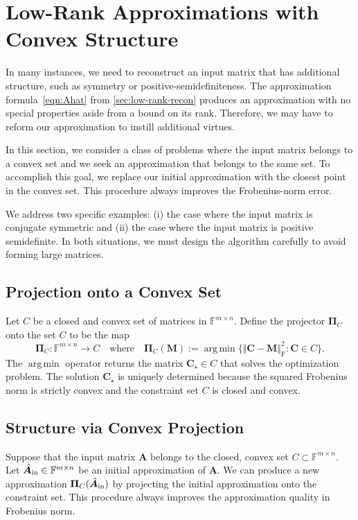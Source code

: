 \documentclass[final]{siamart1116}
\numberwithin{equation}{section}
\numberwithin{theorem}{section}
\numberwithin{figure}{section}
\newcommand{\F}{\mathbb{F}}
\newcommand{\mtx}[1]{\bm{#1}}
\newcommand{\norm}[1]{\Vert #1 \Vert}
\newcommand{\fnorm}[1]{\norm{#1}_{\mathrm{F}}}
\newcommand{\fnormsq}[1]{\fnorm{#1}^2}
\newcommand{\argmin}{\operatorname{arg\,min}}
\begin{document}
\section{Low-Rank Approximations with Convex Structure}
\label{sec:structured}

In many instances, we need to reconstruct an input matrix
that has additional structure, such as symmetry or positive-semidefiniteness.
The approximation formula~\cref{eqn:Ahat}
from \cref{sec:low-rank-recon}
produces an approximation with
no special properties aside from a bound on its rank.
Therefore, we may have to reform our approximation to instill additional virtues.

In this section, we consider a class of problems where
the input matrix belongs to a convex set and we seek an
approximation that belongs to the same set.  To accomplish this
goal, we replace our initial approximation with the
closest point in the convex set.  This procedure always
improves the Frobenius-norm error.

We address two specific examples: (i) the case where
the input matrix is conjugate symmetric and (ii) the case
where the input matrix is positive semidefinite.  In both
situations, we must design the algorithm carefully
to avoid forming large matrices.


\subsection{Projection onto a Convex Set}
\label{sec:pocs}

Let $C$ be a closed and convex set of matrices in $\F^{m \times n}$.
Define the projector $\mtx{\Pi}_C$ onto the set $C$ to be the map
$$
\mtx{\Pi}_C : \F^{m \times n} \to C
\quad\text{where}\quad
\mtx{\Pi}_C(\mtx{M}) := \argmin\big\{ \fnormsq{ \mtx{C} - \mtx{M} } : \mtx{C} \in C \big\}.
$$
The $\argmin$ operator returns the matrix $\mtx{C}_{\star} \in C$ that solves the optimization problem.
The solution $\mtx{C}_{\star}$ is uniquely determined because the squared Frobenius norm is strictly
convex and the constraint set $C$ is closed and convex.

\subsection{Structure via Convex Projection}

Suppose that the input matrix $\mtx{A}$ belongs to the closed, convex set $C \subset \F^{m \times n}$.
Let $\hat{\mtx{A}}_{\rm in} \in \F^{m \times n}$ be an initial approximation of $\mtx{A}$.
We can produce a new approximation $\mtx{\Pi}_C(\hat{\mtx{A}}_{\rm in})$
by projecting the initial approximation onto the constraint set.
This procedure always improves the approximation quality in Frobenius norm.
\end{document}
